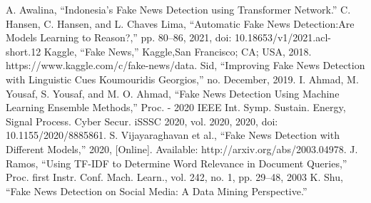 \documentclass[conference]{IEEEtran}
\begin{document}
\begin{thebibliography}{00}
\vspace{12pt}
 A. Awalina, “Indonesia’s Fake News Detection using Transformer Network.”
\vspace{12pt}
 C. Hansen, C. Hansen, and L. Chaves Lima, “Automatic Fake News Detection:Are Models Learning to Reason?,” pp. 80–86, 2021, doi: 10.18653/v1/2021.acl-short.12
\vspace{12pt}
 Kaggle, “Fake News,” Kaggle,San Francisco; CA; USA, 2018. https://www.kaggle.com/c/fake-news/data.
\vspace{12pt}
 Sid, “Improving Fake News Detection with Linguistic Cues Koumouridis Georgios,” no. December, 2019.
\vspace{12pt}
 I. Ahmad, M. Yousaf, S. Yousaf, and M. O. Ahmad, “Fake News Detection Using Machine Learning Ensemble Methods,” Proc. - 2020 IEEE Int. Symp. Sustain. Energy, Signal Process. Cyber Secur. iSSSC 2020, vol. 2020, 2020, doi: 10.1155/2020/8885861.
\vspace{12pt}
 S. Vijayaraghavan et al., “Fake News Detection with Different Models,” 2020, [Online]. Available: http://arxiv.org/abs/2003.04978.
\vspace{12pt}
 J. Ramos, “Using TF-IDF to Determine Word Relevance in Document Queries,” Proc. first Instr. Conf. Mach. Learn., vol. 242, no. 1, pp. 29–48, 2003
\vspace{12pt}
 K. Shu, “Fake News Detection on Social Media: A Data Mining Perspective.”


\end{thebibliography}



\vspace{12pt}
\end{document}
